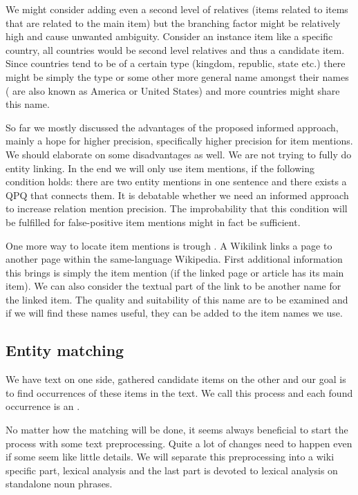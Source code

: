 We might consider adding even a second level of relatives (items related to items that are related to the main item) but the branching factor might be relatively high and cause unwanted ambiguity. Consider an instance item like a specific country, all countries would be second level relatives and thus a candidate item. Since countries tend to be of a certain type (kingdom, republic, state etc.) there might be simply the type or some other more general name amongst their names ( are also known as America or United States) and more countries might share this name.

So far we mostly discussed the advantages of the proposed informed approach, mainly a hope for higher precision, specifically higher precision for item mentions. We should elaborate on some disadvantages as well. We are not trying to fully do entity linking. In the end we will only use item mentions, if the following condition holds: there are two entity mentions in one sentence and there exists a QPQ that connects them. It is debatable whether we need an informed approach to increase relation mention precision. The improbability that this condition will be fulfilled for false-positive item mentions might in fact be sufficient.

One more way to locate item mentions is trough . A Wikilink links a page to another page within the same-language Wikipedia. First additional information this brings is simply the item mention (if the linked page or article has its main item). We can also consider the textual part of the link to be another name for the linked item. The quality and suitability of this name are to be examined and if we will find these names useful, they can be added to the item names we use.




\subsection{Entity matching}

We have text on one side, gathered candidate items on the other and our goal is to find occurrences of these items in the text. We call this process  and each found occurrence is an .

No matter how the matching will be done, it seems always beneficial to start the process with some text preprocessing. Quite a lot of changes need to happen even if some seem like little details. We will separate this preprocessing into a wiki specific part, lexical analysis and the last part is devoted to lexical analysis on standalone noun phrases.

